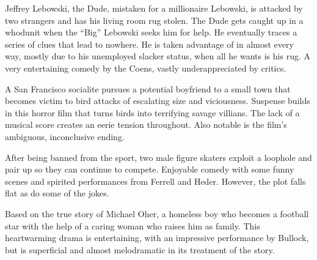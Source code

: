 \iffalse
\movie{Before Midnight}{2012-3?}{107m?}{\threeplus or \four} \dir{?} \cast{Ethan Hawke; Julie Delpy} Life not perfect, how long do/should people actually stay together? If rich, separated? Death: ``want to remember his face'', feel safe. super long takes. technology (iPhone) and INTERACTION (w/ son, others, etc), diffs betw men/women, grandmother stayed together 70+ yrs. Jesse: when child, want speed up. when adult, want slow down. Sunset: going, going, gone. Tremendous script and acting; one of the best of 2013. \author{AW?} \mpaa{R}
\fi

\iffalse
\movie{Ben-Hur}{1959}{212m}{\four} \dir{William Wyler} \cast{Charlton Heston; Jack Hawkins; Stephen Boyd; Hugh Griffith; Haya Harareet} Won 11 Oscars. \author{AW}
\fi

   Jeffrey Lebowski, the Dude, mistaken for a millionaire Lebowski, is attacked by two strangers and has his living room rug stolen. The Dude gets caught up in a whodunit when the ``Big'' Lebowski seeks him for help. He eventually traces a series of clues that lead to nowhere. He is taken advantage of in almost every way, mostly due to his unemployed slacker status, when all he wants is his rug. A very entertaining comedy by the Coens, vastly underappreciated by critics. \author{AW} 

   A San Francisco socialite pursues a potential boyfriend to a small town that becomes victim to bird attacks of escalating size and viciousness. Suspense builds in this horror film that turns birds into terrifying savage villians. The lack of a musical score creates an eerie tension throughout. Also notable is the film's ambiguous, inconclusive ending. \author{DW} 

   After being banned from the sport, two male figure skaters exploit a loophole and pair up so they can continue to compete. Enjoyable comedy with some funny scenes and spirited performances from Ferrell and Heder. However, the plot falls flat as do some of the jokes. \author{DW} 

   Based on the true story of Michael Oher, a homeless boy who becomes a football star with the help of a caring woman who raises him as family. This heartwarming drama is entertaining, with an impressive performance by Bullock, but is superficial and almost melodramatic in its treatment of the story. \author{DW} 
